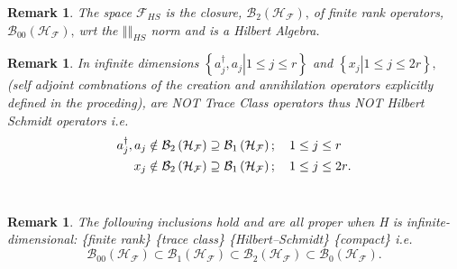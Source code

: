 \documentclass[aps, preprint]{revtex4}
\newtheorem{remark}[theorem]{Remark}
\begin{document}
\begin{remark}
The space $\mathcal{F}_{H S}$ is the closure, $\mathcal{B}_{2} \left (\mathcal{H}_{\mathcal{F}}\right )\text{,}$ of finite rank operators, $\mathcal{B}_{0 0} \left (\mathcal{H}_{\mathcal{F}}\right )\text{,}$ wrt the $\left \Vert \text{}\right \Vert _{H S}$ norm and is a \emph{Hilbert Algebra}. 
\end{remark}


\begin{remark}
In \emph{infinite dimensions} $\left \{\left .a_{j}^{ \dag } ,a_{j}\right \vert 1 \leq j \leq r\text{}\right \}$ and $\left \{\left .x_{j}\right \vert 1 \leq j \leq 2 r\text{}\right \}\text{,}$ (self adjoint combnations of the creation and annihilation operators explicitly defined in the proceding), are \emph{NOT Trace
Class operators thus NOT Hilbert Schmidt operators i.e. }
\begin{align}a_{j}^{ \dag } ,a_{j} &  \notin \mathcal{B}_{2} \left (\mathcal{H}_{\mathcal{F}}\right ) \supseteq \mathcal{B}_{1} \left (\mathcal{H}_{\mathcal{F}}\right ) ;\text{\quad }1 \leq j \leq r \\
x_{j} &  \notin \mathcal{B}_{2} \left (\mathcal{H}_{\mathcal{F}}\right ) \supseteq \mathcal{B}_{1} \left (\mathcal{H}_{\mathcal{F}}\right ) ;\text{\quad }1 \leq j \leq 2 r\text{.}\end{align}\emph{\ } 
\end{remark}


\begin{remark}
The following inclusions hold and are all proper when H is infinite-dimensional: \{finite rank\} {\small{}}  \{trace class\} {\small{}}  \{Hilbert--Schmidt\}
{\small{}}  \{compact\} i.e.
\begin{equation}\mathcal{B}_{0 0} \left (\mathcal{H}_{\mathcal{F}}\right ) \subset \mathcal{B}_{1} \left (\mathcal{H}_{\mathcal{F}}\right ) \subset \mathcal{B}_{2} \left (\mathcal{H}_{\mathcal{F}}\right ) \subset \mathcal{B}_{0} \left (\mathcal{H}_{\mathcal{F}}\right )\text{.}
\end{equation}
\end{remark}
\end{document}
